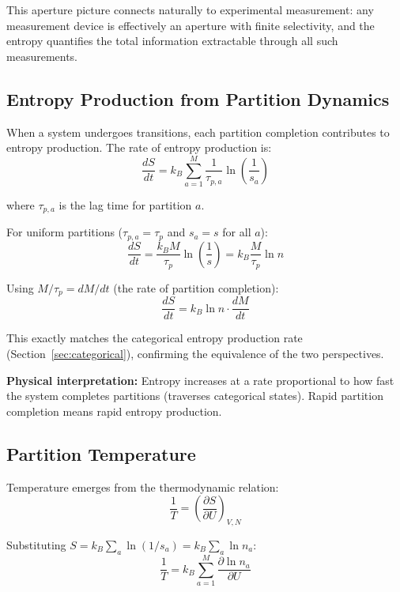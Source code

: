 This aperture picture connects naturally to experimental measurement: any measurement device is effectively an aperture with finite selectivity, and the entropy quantifies the total information extractable through all such measurements.

\subsection{Entropy Production from Partition Dynamics}

When a system undergoes transitions, each partition completion contributes to entropy production. The rate of entropy production is:
\begin{equation}
\frac{dS}{dt} = k_B \sum_{a=1}^{M} \frac{1}{\tau_{p,a}} \ln\left(\frac{1}{s_a}\right)
\end{equation}

where $\tau_{p,a}$ is the lag time for partition $a$.

For uniform partitions ($\tau_{p,a} = \tau_p$ and $s_a = s$ for all $a$):
\begin{equation}
\frac{dS}{dt} = \frac{k_B M}{\tau_p} \ln\left(\frac{1}{s}\right) = k_B \frac{M}{\tau_p} \ln n
\end{equation}

Using $M/\tau_p = dM/dt$ (the rate of partition completion):
\begin{equation}
\frac{dS}{dt} = k_B \ln n \cdot \frac{dM}{dt}
\end{equation}

This exactly matches the categorical entropy production rate (Section~\ref{sec:categorical}), confirming the equivalence of the two perspectives.

\textbf{Physical interpretation:} Entropy increases at a rate proportional to how fast the system completes partitions (traverses categorical states). Rapid partition completion means rapid entropy production.



\subsection{Partition Temperature}

Temperature emerges from the thermodynamic relation:
\begin{equation}
\frac{1}{T} = \left(\frac{\partial S}{\partial U}\right)_{V,N}
\end{equation}

Substituting $S = k_B \sum_a \ln(1/s_a) = k_B \sum_a \ln n_a$:
\begin{equation}
\frac{1}{T} = k_B \sum_{a=1}^{M} \frac{\partial \ln n_a}{\partial U}
\end{equation}

